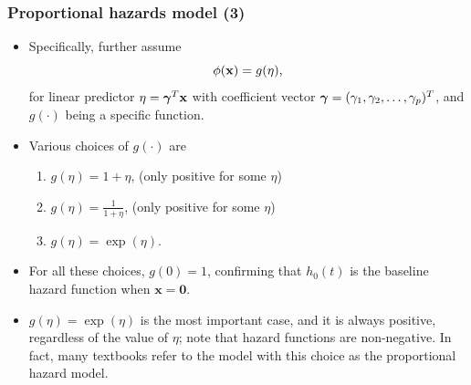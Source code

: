 \documentclass{beamer}
\begin{document}
\begin{frame}\frametitle{Proportional hazards model (3)}


\begin{itemize}
\item Specifically, further assume 
\[\phi({\bf x})= g(\eta), \] 
for  linear predictor $\eta
= \mbox{\boldmath $\gamma$}^T\mathbf{x}$ with coefficient vector $\mbox{\boldmath $\gamma$}
= (\gamma_1 , \gamma_2 ,\ldots, \gamma_p)^T$, and $g( \cdot)$ being a specific
function.  
\item Various choices of $g(\cdot)$ are
\begin{enumerate}
\item $g(\eta) = 1 + \eta$, (only positive for some $\eta$)
\item $g(\eta) = \frac{1}{1+\eta}$, (only positive for some $\eta$)
\item $g(\eta) = \exp (\eta)$.  
\end{enumerate}


\item 
For all these choices, $g(0) = 1$, confirming that $h_0(t)$ is the baseline hazard function when $\mathbf{x} = \mathbf{0}$. 

\item  $g(\eta) = \exp (\eta)$ is the most important case, and
it is always  positive, regardless of the value of $\eta$; note that hazard functions are non-negative.  In fact, many textbooks refer to the model with this choice as the proportional hazard model.
\end{itemize}
\end{frame}

%
%
%
\end{document}
